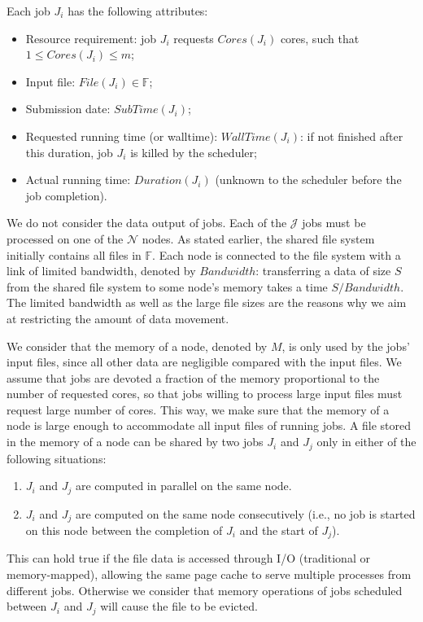 \documentclass[conference]{IEEEtran}
\newcommand{\file}{\ensuremath{\mathit{File}}\xspace}
\newcommand{\memory}{\ensuremath{\mathit{M}}\xspace}
\newcommand{\duration}{\mathit{Duration}\xspace}
\newcommand{\bandwidth}{\mathit{Bandwidth}\xspace}
\newcommand{\core}{\mathit{Cores}\xspace}
\newcommand{\submissiontime}{\mathit{SubTime}\xspace}
\newcommand{\walltime}{\mathit{WallTime}\xspace}
\newcommand{\fileset}{\ensuremath{\mathbb{F}}\xspace}
\newcommand{\jobnum}{\ensuremath{\mathcal{J}}\xspace}
\newcommand{\nodenum}{\ensuremath{\mathcal{N}}\xspace}
\begin{document}
Each job $J_i$ has the following attributes:
\begin{itemize}
\item Resource requirement: job $J_i$ requests $\core(J_i)$  cores, such that $1 \leq \core(J_i) \leq m$;
\item Input file: $\file(J_i) \in \fileset$;
\item Submission date: $\submissiontime(J_i)$;
\item Requested running time (or walltime): $\walltime(J_i)$: if not
  finished after this duration, job $J_i$ is killed by the scheduler;
\item Actual running time: $\duration(J_i)$ (unknown to  the scheduler
  before the job completion).
\end{itemize}

We do not consider the data output of jobs.
Each of the $\jobnum$ jobs must be processed on one of the $\nodenum$ nodes.  As
stated earlier, the shared file system initially contains all files
in $\fileset$.  Each node is connected to the file system with a link
of limited bandwidth, denoted by $\bandwidth$: transferring a data of
size $S$ from the shared file system to some node's memory takes a
time $S/\bandwidth$.
The limited bandwidth
as well as the large file sizes are the reasons why we aim at
restricting the amount of data movement.

We consider that the memory of a node, denoted by
$\memory$, is only used by the jobs' input files, since all other data are
negligible compared with the input files. We assume that jobs are
devoted a fraction of the memory proportional to the number of
requested cores, so that jobs willing to process large input files
must request large number of cores. This way, we make sure that the
memory of a node is large enough to accommodate all input files of running jobs.
A file stored in the memory of a node can be shared by two jobs $J_i$
and $J_j$ only in either of the following situations:
\begin{enumerate}
	\item $J_i$ and $J_j$ are computed in parallel on the same node.
	\item $J_i$ and $J_j$ are computed on the same node
          consecutively (i.e., no job is started on this node between the
          completion of $J_i$ and the start of $J_j$).
\end{enumerate}
This can hold true if the file data is accessed through I/O (traditional or memory-mapped),
allowing the same page cache to serve multiple processes from different jobs.
Otherwise we consider that memory operations of jobs scheduled between
$J_i$ and $J_j$ will cause the file to be evicted.
\end{document}
